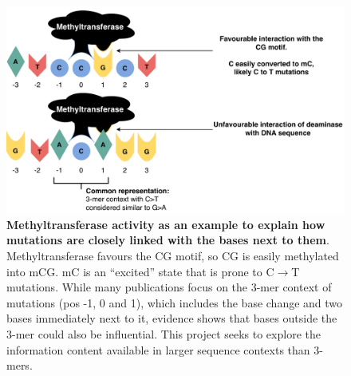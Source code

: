 \begin{figure}[h!]
    \centering
    \includegraphics[scale=0.78]{graphics/motif_demo.pdf}
    \caption{\textbf{Methyltransferase activity as an example to explain how mutations are closely linked with the bases next to them}. Methyltransferase favours the CG motif, so CG is easily methylated into mCG. mC is an ``excited'' state that is prone to C$\rightarrow$T mutations. While many publications focus on the 3-mer context of mutations (pos -1, 0 and 1), which includes the base change and two bases immediately next to it, evidence shows that bases outside the 3-mer could also be influential. This project seeks to explore the information content available in larger sequence contexts than 3-mers.}
    \label{fig:motif_demo}
\end{figure}
